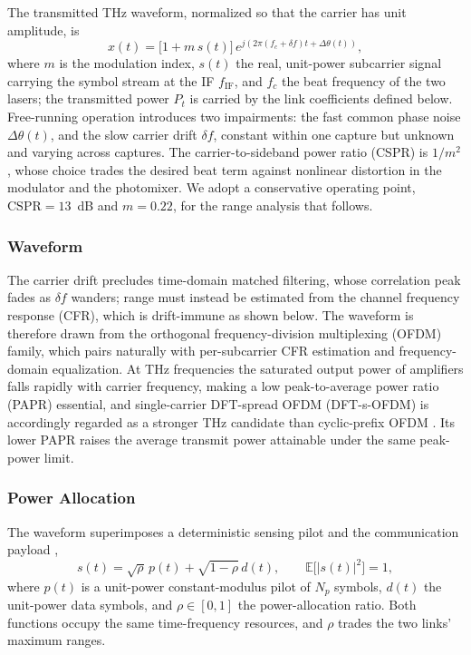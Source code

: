 \documentclass[10pt,journal,comsoc]{IEEEtran}
\begin{document}
The transmitted THz waveform, normalized so that the carrier has unit
amplitude, is
\begin{equation}
x(t)=\big[1+m\,s(t)\big]\,
e^{j\left(2\pi (f_c+\delta\!f)t+\Delta\theta(t)\right)},
\label{eq:xt}
\end{equation}
where $m$ is the modulation index, $s(t)$ the real, unit-power
subcarrier signal carrying the symbol stream at the IF $f_{\mathrm{IF}}$,
and $f_c$ the beat frequency of the two lasers; the
transmitted power $P_t$ is carried by the link coefficients defined
below. Free-running operation introduces two impairments: the fast
common phase noise $\Delta\theta(t)$, and the slow carrier drift
$\delta\!f$, constant within one capture but unknown and varying across
captures. The carrier-to-sideband power ratio (CSPR) is $1/m^2$, whose choice
trades the desired beat term against nonlinear distortion in the
modulator and the photomixer. We adopt a conservative operating point,
$\mathrm{CSPR}=13$~dB and $m=0.22$, for the range analysis that
follows.

\subsubsection{Waveform}
The carrier drift precludes time-domain matched filtering, whose
correlation peak fades as $\delta\!f$ wanders; range must instead be
estimated from the channel frequency response (CFR), which is
drift-immune as shown below. The waveform is therefore drawn from the
orthogonal frequency-division multiplexing (OFDM) family, which pairs
naturally with per-subcarrier CFR estimation and frequency-domain
equalization. At THz frequencies the saturated output power of
amplifiers falls rapidly with carrier frequency, making a low
peak-to-average power ratio (PAPR) essential, and single-carrier
DFT-spread OFDM (DFT-s-OFDM) is accordingly regarded as a stronger THz
candidate than cyclic-prefix OFDM \cite{Han2023}. Its lower PAPR raises the
average transmit power attainable under the same peak-power limit.

\subsubsection{Power Allocation}
The waveform superimposes a deterministic sensing pilot and the
communication payload \cite{lyu_exploring_2025},
\begin{equation}
s(t)=\sqrt{\rho}\,p(t)+\sqrt{1-\rho}\,d(t),\qquad
\mathbb E\big[|s(t)|^2\big]=1,
\label{eq:st}
\end{equation}
where $p(t)$ is a unit-power constant-modulus pilot of $N_p$ symbols,
$d(t)$ the unit-power data symbols, and $\rho\in[0,1]$ the
power-allocation ratio. Both functions occupy the same time-frequency
resources, and $\rho$ trades the two links' maximum ranges.
\end{document}
